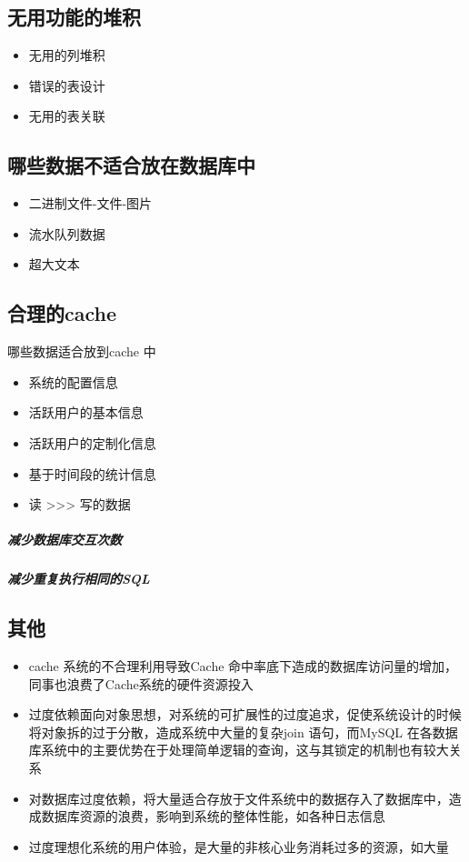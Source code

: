 \documentclass[UTF8,a4paper,12pt]{ctexbook}
\begin{document}
		\subsection{无用功能的堆积}
			\begin{itemize}
				\item 无用的列堆积
				\item 错误的表设计
				\item 无用的表关联
			\end{itemize}
		
		
		\subsection{哪些数据不适合放在数据库中}
			\begin{itemize}
				\item 二进制文件-文件-图片
				\item 流水队列数据
				\item 超大文本
			\end{itemize}
		
		
		\subsection{合理的cache}
			哪些数据适合放到cache 中
			\begin{itemize}
				\item 系统的配置信息 
				\item 活跃用户的基本信息 
				\item 活跃用户的定制化信息
				\item 基于时间段的统计信息
				\item 读 >>> 写的数据
			\end{itemize}
		
		\subparagraph{减少数据库交互次数}
		\subparagraph{减少重复执行相同的SQL}
	
		\subsection{其他}
			\begin{itemize}
				\item cache 系统的不合理利用导致Cache 命中率底下造成的数据库访问量的增加，同事也浪费了Cache系统的硬件资源投入
				\item 过度依赖面向对象思想，对系统的可扩展性的过度追求，促使系统设计的时候将对象拆的过于分散，造成系统中大量的复杂join 语句，而MySQL 在各数据库系统中的主要优势在于处理简单逻辑的查询，这与其锁定的机制也有较大关系
				\item 对数据库过度依赖，将大量适合存放于文件系统中的数据存入了数据库中，造成数据库资源的浪费，影响到系统的整体性能，如各种日志信息
				\item 过度理想化系统的用户体验，是大量的非核心业务消耗过多的资源，如大量
			\end{itemize}
			
\end{document}
